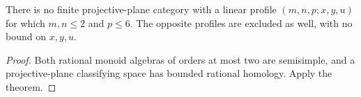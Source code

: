 \begin{corollary}\label{C:two-small-corners-six-endpoint}
There is no finite projective-plane category with a linear
profile $(m,n,p;x,y,u)$ for which $m,n\leq2$ and $p\leq6$.
The opposite profiles are excluded as well, with no bound
on $x,y,u$.
\end{corollary}
\begin{proof}
Both rational monoid algebras of orders at most two are
semisimple, and a projective-plane classifying space has
bounded rational homology. Apply the theorem.
\end{proof}
